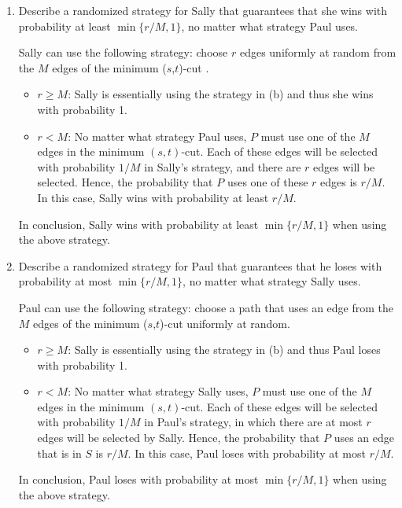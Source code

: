 \documentclass[letterpaper,11pt]{article}
\begin{document}
\begin{enumerate}
\begin{enumerate}
  \item 
    Describe a randomized strategy for Sally that guarantees that she wins with
    probability at least $\min\{r/M,1\}$, no matter what strategy Paul uses.
    \begin{solution}
      Sally can use the following strategy: choose $r$ edges uniformly at
      random from the $M$ edges of the minimum ($s$,$t$)-cut .
	\begin{itemize}
	  \item $r \geq M$: Sally is essentially using the strategy in (b)
	    and thus she wins with probability 1.
	  \item $r < M$: No matter what strategy Paul uses, $P$ must 
	    use one of the $M$ edges in the minimum $(s,t)$-cut. 
	    Each of these edges will be selected with probability $1/M$ 
	    in Sally's strategy, and there are $r$ edges will be selected.
	    Hence, the probability that $P$ uses one of these $r$ edges 
	    is $r/M$. In this case, Sally wins with probability at least $r/M$.
	\end{itemize}
	In conclusion, Sally wins with probability at least $\min\{r/M,1\}$
	when using the above strategy.
    \end{solution}
  \item 
    Describe a randomized strategy for Paul that guarantees that he loses with
    probability at most $\min\{r/M,1\}$, no matter what strategy Sally uses.
    \begin{solution}
      Paul can use the following strategy: choose a path that uses an edge
      from the $M$ edges of the minimum ($s$,$t$)-cut uniformly at random.
	\begin{itemize}
	  \item $r \geq M$: Sally is essentially using the strategy in (b)
	    and thus Paul loses with probability 1.
	  \item $r < M$: No matter what strategy Sally uses, $P$ must 
	    use one of the $M$ edges in the minimum $(s,t)$-cut. 
	    Each of these edges will be selected with probability $1/M$ 
	    in Paul's strategy, in which there are at most $r$ edges 
	    will be selected by Sally.
	    Hence, the probability that $P$ uses an edge that is in $S$
	    is $r/M$. 
	    In this case, Paul loses with probability at most $r/M$.
	\end{itemize}
	In conclusion, Paul loses with probability at most $\min\{r/M,1\}$
	when using the above strategy.
    \end{solution}


\end{enumerate}


\end{enumerate}
\end{document}
